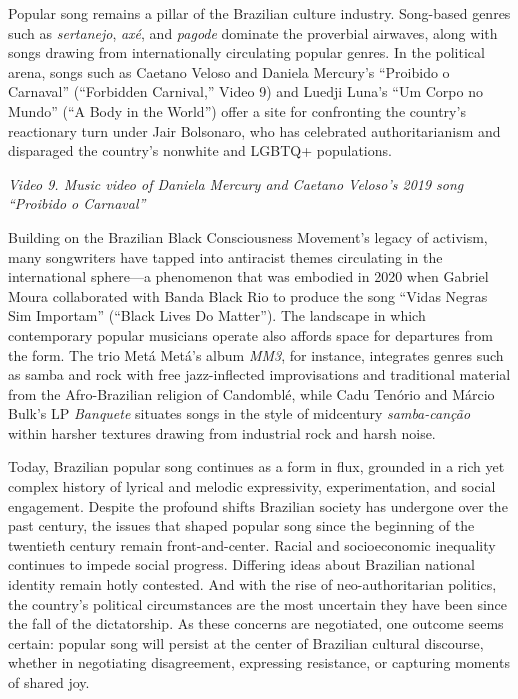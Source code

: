 \documentclass[twoside]{article}
\begin{document}
Popular song remains a pillar of the Brazilian culture industry.
Song-based genres such as \emph{sertanejo}, \emph{axé}, and
\emph{pagode} dominate the proverbial airwaves, along with songs drawing
from internationally circulating popular genres. In the political arena,
songs such as Caetano Veloso and Daniela Mercury's ``Proibido o
Carnaval'' (``Forbidden Carnival,'' Video 9) and Luedji Luna's ``Um
Corpo no Mundo'' (``A Body in the World'') offer a site for confronting
the country's reactionary turn under Jair Bolsonaro, who has celebrated
authoritarianism and disparaged the country's nonwhite and LGBTQ+
populations.

\emph{Video 9. Music video of Daniela Mercury and Caetano Veloso's 2019
song ``Proibido o Carnaval''}

Building on the Brazilian Black Consciousness Movement's legacy of
activism, many songwriters have tapped into antiracist themes
circulating in the international sphere---a phenomenon that was embodied
in 2020 when Gabriel Moura collaborated with Banda Black Rio to produce
the song ``Vidas Negras Sim Importam'' (``Black Lives Do Matter''). The
landscape in which contemporary popular musicians operate also affords
space for departures from the form. The trio Metá Metá's album
\emph{MM3}, for instance, integrates genres such as samba and rock with
free jazz-inflected improvisations and traditional material from the
Afro-Brazilian religion of Candomblé, while Cadu Tenório and Márcio
Bulk's LP \emph{Banquete} situates songs in the style of midcentury
\emph{samba-canção} within harsher textures drawing from industrial rock
and harsh noise.

Today, Brazilian popular song continues as a form in flux, grounded in a
rich yet complex history of lyrical and melodic expressivity,
experimentation, and social engagement. Despite the profound shifts
Brazilian society has undergone over the past century, the issues that
shaped popular song since the beginning of the twentieth century remain
front-and-center. Racial and socioeconomic inequality continues to
impede social progress. Differing ideas about Brazilian national
identity remain hotly contested. And with the rise of neo-authoritarian
politics, the country's political circumstances are the most uncertain
they have been since the fall of the dictatorship. As these concerns are
negotiated, one outcome seems certain: popular song will persist at the
center of Brazilian cultural discourse, whether in negotiating
disagreement, expressing resistance, or capturing moments of shared joy.
\end{document}
